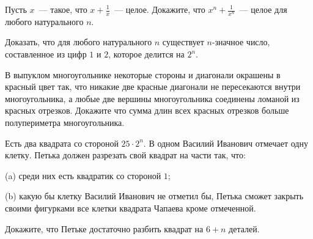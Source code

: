 \begin{problems}



\item
Пусть $x$~--- такое, что $x+ \frac{1}{x}$~--- целое. Докажите, что
$x^n + \frac{1}{x^n}$~--- целое для любого натурального $n$.




\item
Доказать, что для любого натурального $n$ существует $n$-значное число, составленное из цифр $1$ и $2$, которое делится на $2^n$.

\item
В выпуклом многоугольнике некоторые стороны и диагонали окрашены в
красный цвет так, что никакие две красные диагонали не пересекаются
внутри многоугольника, а любые две вершины многоугольника соединены
ломаной из красных отрезков. Докажите что сумма длин всех красных
отрезков больше полупериметра многоугольника.

\item 
Есть два квадрата со стороной $25\cdot 2^n$. В одном Василий Иванович отмечает одну клетку. Петька должен разрезать свой квадрат на части так, что:

(a) среди них есть квадратик со стороной $1$;

(b) какую бы клетку Василий Иванович не отметил бы, Петька сможет закрыть своими фигурками все клетки квадрата Чапаева кроме отмеченной. 

Докажите, что Петьке достаточно разбить квадрат на $6+n$ деталей.








\end{problems}

